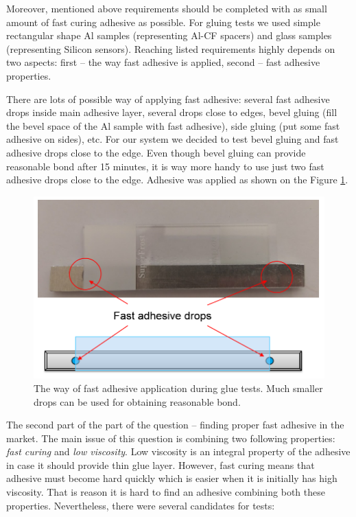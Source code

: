 Moreover, mentioned above requirements should be completed with as small amount of fast curing adhesive as possible. For gluing tests we used simple rectangular shape Al samples (representing Al-CF spacers) and glass samples (representing Silicon sensors). Reaching listed requirements highly depends on two aspects: first -- the way fast adhesive is applied, second -- fast adhesive properties.

There are lots of possible way of applying fast adhesive: several fast adhesive drops inside main adhesive layer, several drops close to edges, bevel gluing (fill the bevel space of the Al sample with fast adhesive), side gluing (put some fast adhesive on sides), etc. For our system we decided to test bevel gluing and fast adhesive drops close to the edge. Even though bevel gluing can provide reasonable bond after 15 minutes, it is way more handy to use just two fast adhesive drops close to the edge. Adhesive was applied as shown on the Figure \ref{fig:glue_application}. 

\begin{figure}[ht]\centering
\includegraphics[width=0.7\linewidth]{Data/Module_assembly/Fast_glue_application.png}
\caption{The way of fast adhesive application during glue tests. Much smaller drops can be used for obtaining reasonable bond.}
\label{fig:glue_application}
\end{figure}

The second part of the part of the question -- finding proper fast adhesive in the market. The main issue of this question is combining two following properties: \emph{fast curing} and \emph{low viscosity}. Low viscosity is an integral property of the adhesive in case it should provide thin glue layer. However, fast curing means that adhesive must become hard quickly which is easier when it is initially has high viscosity. That is reason it is hard to find an adhesive combining both these properties. Nevertheless, there were several candidates for tests:

